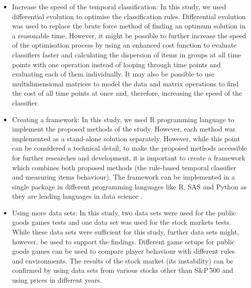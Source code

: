 \begin{itemize}
    \item Increase the speed of the temporal classification: In this study, we used differential evolution to optimise the classification rules. Differential evolution was used to replace the brute force method of finding an optimum solution in a reasonable time. However, it might be possible to further increase the speed of the optimisation process by using an enhanced cost function to evaluate classifiers faster and calculating the dispersion of items in groups at all time points with one operation instead of looping through time points and evaluating each of them individually. It may also be possible to use multidimensional matrices to model the data and matrix operations to find the cost of all time points at once and, therefore, increasing the speed of the classifier.
    
    
    \item Creating a framework: In this study, we used R programming language to implement the proposed methods of the study. However, each method was implemented as a stand-alone solution separately. However, while this point can be considered a technical detail, to make the proposed methods accessible for further researches and development, it is important to create a framework which combines both proposed methods (the rule-based temporal classifier and measuring items behaviour). The framework can be implemented in a single package in different programming languages like R, SAS and Python as they are leading languages in data science \cite{Piatetsky2014}. 
    
    \item Using more data sets: In this study, two data sets were used for the public goods games tests and one data set was used for the stock markets tests. While these data sets were sufficient for this study, further data sets might, however, be used to support the findings. Different game setups for public goods games can be used to compare player behaviour with different rules and environments. The results of the stock market (its instability) can be confirmed by using data sets from various stocks other than  S\&P\,500 and using prices in different years.
\end{itemize}


